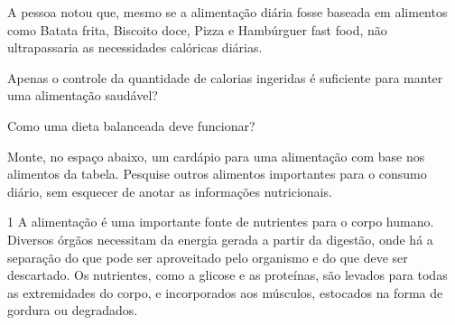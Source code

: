 
A pessoa notou que, mesmo se a alimentação diária fosse baseada em
alimentos como Batata frita, Biscoito doce, Pizza e Hambúrguer fast
food, não ultrapassaria as necessidades calóricas diárias.

\begin{escolha}
\item Apenas o controle da quantidade de calorias ingeridas é
suficiente para manter uma alimentação saudável?


\item Como uma dieta balanceada deve funcionar?


\item Monte, no espaço abaixo, um cardápio para uma alimentação
com base nos alimentos da tabela. Pesquise outros alimentos importantes
para o consumo diário, sem esquecer de anotar as informações
nutricionais.


\end{escolha}


\num{1} A alimentação é uma importante fonte de nutrientes para o
corpo humano. Diversos órgãos necessitam da energia gerada a partir da
digestão, onde há a separação do que pode ser aproveitado pelo organismo
e do que deve ser descartado. Os nutrientes, como a glicose e as
proteínas, são levados para todas as extremidades do corpo, e
incorporados aos músculos, estocados na forma de gordura ou degradados.

